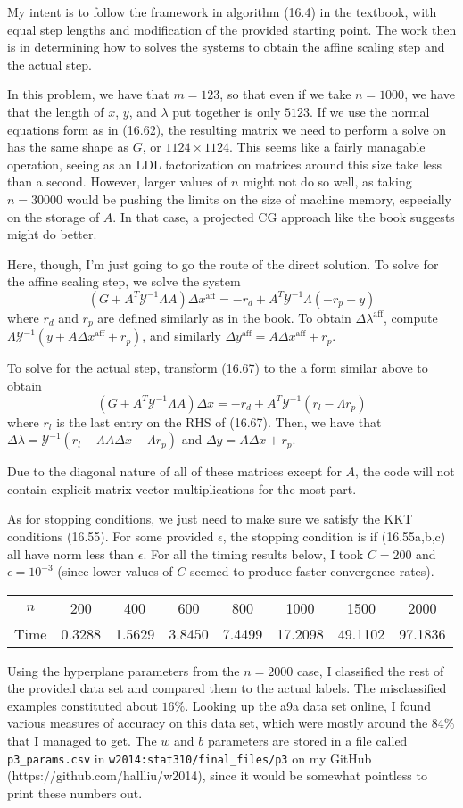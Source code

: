 \documentclass{article}
\newcommand{\ep}{\epsilon}
\begin{document}
My intent is to follow the framework in algorithm (16.4) in the textbook, with equal step lengths and modification of the provided starting point. The work then is in determining how to solves the systems to obtain the affine scaling step and the actual step. 

In this problem, we have that $m=123$, so that even if we take $n=1000$, we have that the length of $x$, $y$, and $\lambda$ put together is only $5123$. If we use the normal equations form as in (16.62), the resulting matrix we need to perform a solve on has the same shape as $G$, or $1124\times1124$. This seems like a fairly managable operation, seeing as an LDL factorization on matrices around this size take less than a second. However, larger values of $n$ might not do so well, as taking $n=30000$ would be pushing the limits on the size of machine memory, especially on the storage of $A$. In that case, a projected CG approach like the book suggests might do better.

Here, though, I'm just going to go the route of the direct solution. To solve for the affine scaling step, we solve the system
\[(G+A^T\mathscr{Y}^{-1}\Lambda A)\Delta x^\text{aff}=-r_d+A^T\mathscr{Y}^{-1}\Lambda(-r_p-y)\]
where $r_d$ and $r_p$ are defined similarly as in the book. To obtain $\Delta\lambda^\text{aff}$, compute $\Lambda\mathscr{Y}^{-1}(y+A\Delta x^\text{aff}+r_p)$, and similarly $\Delta y^\text{aff}=A\Delta x^\text{aff}+r_p$. 

To solve for the actual step, transform (16.67) to the a form similar above to obtain
\[(G+A^T\mathscr{Y}^{-1}\Lambda A)\Delta x=-r_d+A^T\mathscr{Y}^{-1}(r_l-\Lambda r_p)\]
where $r_l$ is the last entry on the RHS of (16.67). Then, we have that $\Delta\lambda=\mathscr{Y}^{-1}(r_l-\Lambda A\Delta x-\Lambda r_p)$ and $\Delta y=A\Delta x+r_p$.

Due to the diagonal nature of all of these matrices except for $A$, the code will not contain explicit matrix-vector multiplications for the most part.

As for stopping conditions, we just need to make sure we satisfy the KKT conditions (16.55). For some provided $\ep$, the stopping condition is if (16.55a,b,c) all have norm less than $\ep$.
For all the timing results below, I took $C=200$ and $\ep=10^{-3}$ (since lower values of $C$ seemed to produce faster convergence rates). 
\begin{tabular}{c|ccccccc}
    $n$&200&400&600&800&1000&1500&2000\\
    Time&0.3288&1.5629&3.8450&7.4499&17.2098&49.1102&97.1836\\
\end{tabular}

Using the hyperplane parameters from the $n=2000$ case, I classified the rest of the provided data set and compared them to the actual labels. The misclassified examples constituted about $16\%$. Looking up the a9a data set online, I found various measures of accuracy on this data set, which were mostly around the $84\%$ that I managed to get. The $w$ and $b$ parameters are stored in a file called \verb|p3_params.csv| in \verb|w2014:stat310/final_files/p3| on my GitHub (https://github.com/hallliu/w2014), since it would be somewhat pointless to print these numbers out.
\end{document}
